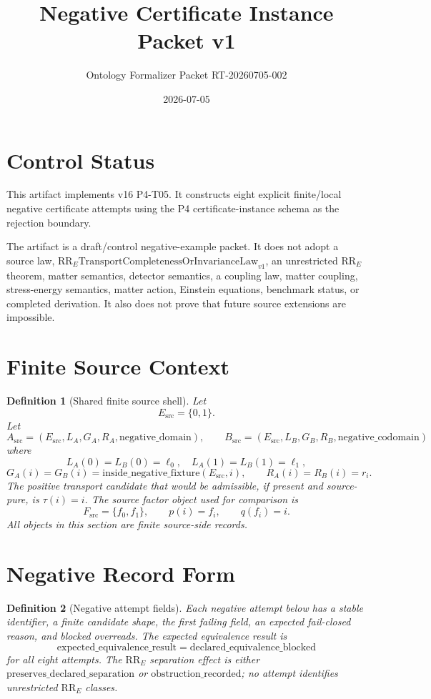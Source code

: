 \documentclass[11pt]{article}
\title{Negative Certificate Instance Packet v1}
\author{Ontology Formalizer Packet RT-20260705-002}
\date{2026-07-05}
\newcommand{\Esrc}{E_{\mathrm{src}}}
\newcommand{\Asrc}{A_{\mathrm{src}}}
\newcommand{\Bsrc}{B_{\mathrm{src}}}
\newcommand{\Fsrc}{F_{\mathrm{src}}}
\newcommand{\RRE}{\mathrm{RR}_{E}}
\newcommand{\RRELaw}{\mathrm{RR}_{E}\mathrm{TransportCompletenessOrInvarianceLaw}_{v1}}
\newtheorem{definition}{Definition}
\begin{document}
\maketitle

\section{Control Status}

This artifact implements v16 P4-T05. It constructs eight explicit
finite/local negative certificate attempts using the P4 certificate-instance
schema as the rejection boundary.

The artifact is a draft/control negative-example packet. It does not adopt a
source law, \(\RRELaw\), an unrestricted \(\RRE\) theorem, matter semantics,
detector semantics, a coupling law, matter coupling, stress-energy semantics,
matter action, Einstein equations, benchmark status, or completed derivation.
It also does not prove that future source extensions are impossible.

\section{Finite Source Context}

\begin{definition}[Shared finite source shell]
Let
\[
  \Esrc=\{0,1\}.
\]
Let
\[
  \Asrc=(\Esrc,L_A,G_A,R_A,\mathrm{negative\_domain}),
  \qquad
  \Bsrc=(\Esrc,L_B,G_B,R_B,\mathrm{negative\_codomain})
\]
where
\[
  L_A(0)=L_B(0)=\ell_0,\quad L_A(1)=L_B(1)=\ell_1,
\]
\[
  G_A(i)=G_B(i)=\mathrm{inside\_negative\_fixture}(\Esrc,i),
  \qquad R_A(i)=R_B(i)=r_i.
\]
The positive transport candidate that would be admissible, if present and
source-pure, is \(\tau(i)=i\). The source factor object used for comparison is
\[
  \Fsrc=\{f_0,f_1\},\qquad p(i)=f_i,\qquad q(f_i)=i.
\]
All objects in this section are finite source-side records.
\end{definition}

\section{Negative Record Form}

\begin{definition}[Negative attempt fields]
Each negative attempt below has a stable identifier, a finite candidate shape,
the first failing field, an expected fail-closed reason, and blocked overreads.
The expected equivalence result is
\[
  \mathrm{expected\_equivalence\_result}
  =\mathrm{declared\_equivalence\_blocked}
\]
for all eight attempts. The \(\RRE\) separation effect is either
\(\mathrm{preserves\_declared\_separation}\) or
\(\mathrm{obstruction\_recorded}\); no attempt identifies unrestricted
\(\RRE\) classes.
\end{definition}
\end{document}
